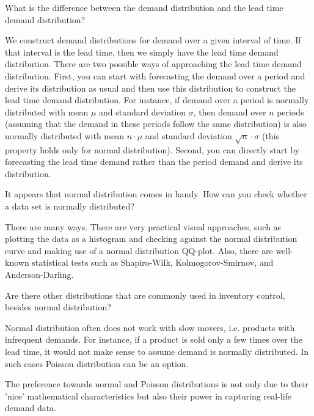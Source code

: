 \begin{exercise}
What is the difference between the demand distribution and the lead time demand distribution?


\begin{solution}
We construct demand distributions for demand over a given interval of time. If that interval is the lead time, then we simply have the lead time demand distribution. There are two possible ways of approaching the lead time demand distribution. First, you can start with forecasting the demand over a period and derive its distribution as usual and then use this distribution to construct the lead time demand distribution. For instance, if demand over a period is normally distributed with mean $\mu$ and standard deviation $\sigma$, then demand over $n$ periods (assuming that the demand in these periods follow the same distribution) is also normally distributed with mean $n\cdot\mu$ and standard deviation $\sqrt{n}\cdot \sigma$ (this property holds only for normal distribution). Second, you can directly start by forecasting the lead time demand rather than the period demand and derive its distribution.
\end{solution}
\end{exercise}

\begin{exercise}
It appears that normal distribution comes in handy. How can you check whether a data set is normally distributed?


\begin{solution}
There are many ways. There are very practical visual approaches, such as plotting the data as a histogram and checking against the normal distribution curve and making use of a normal distribution QQ-plot. Also, there are well-known statistical tests such as Shapiro-Wilk, Kolmogorov-Smirnov, and Anderson-Darling.
\end{solution}
\end{exercise}

\begin{exercise}
Are there other distributions that are commonly used in inventory control, besides normal distribution?


\begin{solution}
Normal distribution often does not work with slow movers, i.e. products with infrequent demands. For instance, if a product is sold only a few times over the lead time, it would not make sense to assume demand is normally distributed. In such cases Poisson distribution can be an option. 

The preference towards normal and Poisson distributions is not only due to their 'nice' mathematical characteristics but also their power in capturing real-life demand data.
\end{solution}
\end{exercise}



\clearpage

